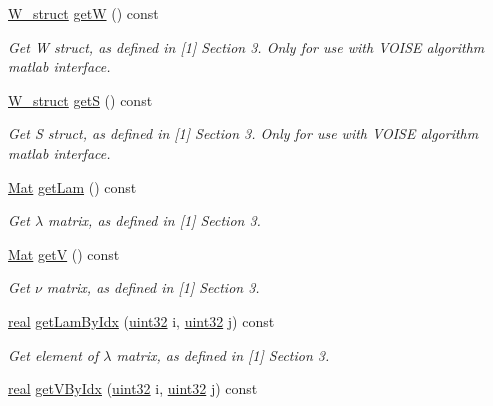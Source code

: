 \begin{DoxyCompactItemize}
\mbox{\hyperlink{structW__struct}{W\+\_\+struct}} \mbox{\hyperlink{classvd_ab4d0d9ea76cedf1a6825b62c9ec2d118}{getW}} () const
\begin{DoxyCompactList}\small\item\em Get W struct, as defined in \mbox{[}1\mbox{]} Section 3. Only for use with V\+O\+I\+SE algorithm matlab interface. \end{DoxyCompactList}\item 
\mbox{\hyperlink{structW__struct}{W\+\_\+struct}} \mbox{\hyperlink{classvd_a7f901e0c6d226b81f262c2363a69844a}{getS}} () const
\begin{DoxyCompactList}\small\item\em Get S struct, as defined in \mbox{[}1\mbox{]} Section 3. Only for use with V\+O\+I\+SE algorithm matlab interface. \end{DoxyCompactList}\item 
\mbox{\hyperlink{typedefs_8h_a9fa28c1f74e909474857584f5c7b0088}{Mat}} \mbox{\hyperlink{classvd_a37c4ab12669eb276fe7fa4a610310345}{get\+Lam}} () const
\begin{DoxyCompactList}\small\item\em Get $\lambda$ matrix, as defined in \mbox{[}1\mbox{]} Section 3. \end{DoxyCompactList}\item 
\mbox{\hyperlink{typedefs_8h_a9fa28c1f74e909474857584f5c7b0088}{Mat}} \mbox{\hyperlink{classvd_aad4ea5c045b8380f83b0490af2fee0fa}{getV}} () const
\begin{DoxyCompactList}\small\item\em Get $\nu$ matrix, as defined in \mbox{[}1\mbox{]} Section 3. \end{DoxyCompactList}\item 
\mbox{\hyperlink{typedefs_8h_a58a0c7cf2501f4492da833421be92547}{real}} \mbox{\hyperlink{classvd_a5c26b069f893aa82eeaf53ff608eda1f}{get\+Lam\+By\+Idx}} (\mbox{\hyperlink{typedefs_8h_a8ad23e2333787a214e20a58a284a5a60}{uint32}} i, \mbox{\hyperlink{typedefs_8h_a8ad23e2333787a214e20a58a284a5a60}{uint32}} j) const
\begin{DoxyCompactList}\small\item\em Get element of $\lambda$ matrix, as defined in \mbox{[}1\mbox{]} Section 3. \end{DoxyCompactList}\item 
\mbox{\hyperlink{typedefs_8h_a58a0c7cf2501f4492da833421be92547}{real}} \mbox{\hyperlink{classvd_a640ed20e4618abd409e180a707eea3b1}{get\+V\+By\+Idx}} (\mbox{\hyperlink{typedefs_8h_a8ad23e2333787a214e20a58a284a5a60}{uint32}} i, \mbox{\hyperlink{typedefs_8h_a8ad23e2333787a214e20a58a284a5a60}{uint32}} j) const

\end{DoxyCompactItemize}
